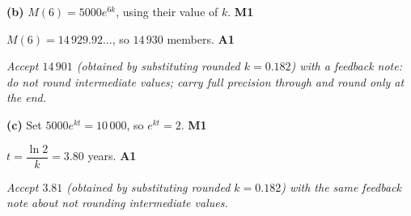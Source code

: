 \documentclass[12pt, twoside]{article}
\begin{document}
\begin{enumerate}[itemsep=0.3cm]
\textbf{(b)} $M(6)=5000e^{6k}$, using their value of $k$.
\hfill \textbf{M1}

$M(6)=14\,929.92\ldots$, so $14\,930$ members. \hfill \textbf{A1}

\emph{Accept $14\,901$ (obtained by substituting rounded $k=0.182$)
with a feedback note: do not round intermediate values; carry full
precision through and round only at the end.}

\medskip

\textbf{(c)} Set $5000e^{kt}=10\,000$, so $e^{kt}=2$.
\hfill \textbf{M1}

$t=\dfrac{\ln 2}{k}=3.80$ years. \hfill \textbf{A1}

\emph{Accept $3.81$ (obtained by substituting rounded $k=0.182$) with
the same feedback note about not rounding intermediate values.}

\end{enumerate}
\end{document}
